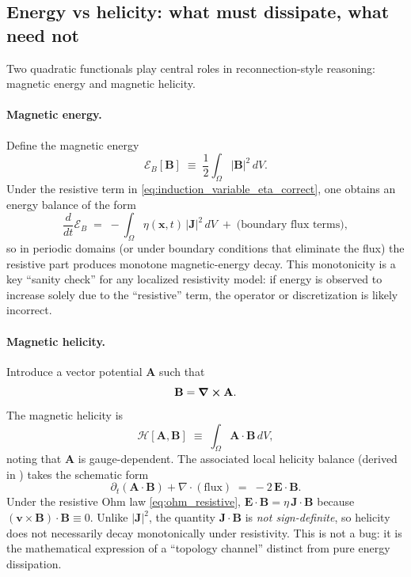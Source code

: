 \documentclass[11pt]{article}
\theoremstyle{plain}
\theoremstyle{definition}
\theoremstyle{remark}
\newcommand{\diver}{\nabla\cdot}
\newcommand{\A}{\mathbf{A}}
\newcommand{\B}{\mathbf{B}}
\newcommand{\E}{\mathbf{E}}
\newcommand{\J}{\mathbf{J}}
\newcommand{\vfield}{\mathbf{v}}
\begin{document}
\subsection{Energy vs helicity: what must dissipate, what need not}\label{sec:background_energy_helicity}
Two quadratic functionals play central roles in reconnection-style reasoning: magnetic energy and
magnetic helicity.

\paragraph{Magnetic energy.}
Define the magnetic energy
\begin{equation}\label{eq:magnetic_energy_def}
  \mathcal{E}_B[\B] \;\equiv\; \frac{1}{2}\int_{\Omega}|\B|^2\,dV.
\end{equation}
Under the resistive term in \eqref{eq:induction_variable_eta_correct}, one obtains an energy balance of
the form
\begin{equation}\label{eq:magnetic_energy_balance_background}
  \frac{d}{dt}\mathcal{E}_B
  \;=\;
  -\int_{\Omega}\eta(\mathbf{x},t)\,|\J|^2\,dV
  \;+\; \text{(boundary flux terms)},
\end{equation}
so in periodic domains (or under boundary conditions that eliminate the flux) the resistive part
produces monotone magnetic-energy decay. This monotonicity is a key ``sanity check'' for any localized
resistivity model: if energy is observed to increase solely due to the ``resistive'' term, the operator
or discretization is likely incorrect.

\paragraph{Magnetic helicity.}
Introduce a vector potential $\A$ such that
\begin{equation}\label{eq:vector_potential_def}
  \B = \curl\A.
\end{equation}
The magnetic helicity is
\begin{equation}\label{eq:helicity_def_background}
  \mathcal{H}[\A,\B] \;\equiv\; \int_{\Omega}\A\cdot\B\,dV,
\end{equation}
noting that $\A$ is gauge-dependent. The associated local helicity balance (derived in
) takes the schematic form
\begin{equation}\label{eq:helicity_balance_background}
  \partial_t(\A\cdot\B) + \diver(\text{flux}) \;=\; -2\,\E\cdot\B.
\end{equation}
Under the resistive Ohm law \eqref{eq:ohm_resistive}, $\E\cdot\B = \eta\,\J\cdot\B$ because
$(\vfield\times\B)\cdot\B\equiv 0$. Unlike $|\J|^2$, the quantity $\J\cdot\B$ is \emph{not sign-definite},
so helicity does not necessarily decay monotonically under resistivity. This is not a bug: it is the
mathematical expression of a ``topology channel'' distinct from pure energy dissipation.
\end{document}
